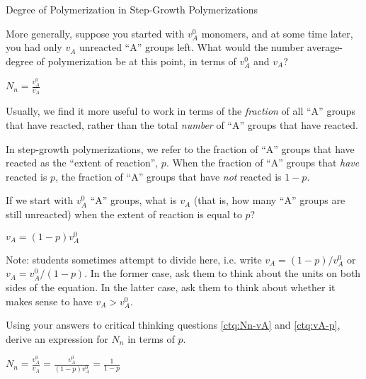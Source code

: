 \begin{activity}{Degree of Polymerization in Step-Growth Polymerizations}
\begin{ctqs}
		\question \label{ctq:Nn-vA} More generally, suppose you started with $v_A^0$ monomers, and at some time later, you had only $v_A$ unreacted ``A'' groups left.  What would the number average-degree of polymerization be at this point, in terms of $v_A^0$ and $v_A$?
				
					\begin{solution}[0.75in]{}
						$N_n = \frac{v_A^0}{v_A}$
					\end{solution}
		
\end{ctqs}
	
\begin{infobox}

Usually, we find it more useful to work in terms of the \emph{fraction} of all ``A'' groups that have reacted, rather than the total \emph{number} of ``A'' groups that have reacted.

In step-growth polymerizations, we refer to the fraction of ``A'' groups that have reacted as the ``extent of reaction'', $p$.
When the fraction of ``A'' groups that \emph{have} reacted is $p$, the fraction of ``A'' groups that have \emph{not} reacted is $1-p$.

\end{infobox}
	
\begin{ctqs}
		
		\question \label{ctq:vA-p} If we start with $v_A^0$ ``A'' groups, what is $v_A$ (that is, how many ``A'' groups are still unreacted) when the extent of reaction is equal to $p$?
		
		\begin{solution}[1in]{}
			$v_A = (1-p)v_A^0$
			
			Note: students sometimes attempt to divide here, i.e. write $v_A = (1-p)/v_A^0$ or $v_A = v_A^0/(1-p)$. In the former case, ask them to think about the units on both sides of the equation.  In the latter case, ask them to think about whether it makes sense to have $v_A > v_A^0$.
		\end{solution}
		
		\question Using your answers to critical thinking questions \ref{ctq:Nn-vA} and \ref{ctq:vA-p}, derive an expression for $N_n$ in terms of $p$.
		
		\begin{solution}[1in]{}
			$N_n = \frac{v_A^0}{v_A} = \frac{v_A^0}{(1-p)v_A^0} = \frac{1}{1-p}$
		\end{solution}
		
\end{ctqs}


\end{activity}
